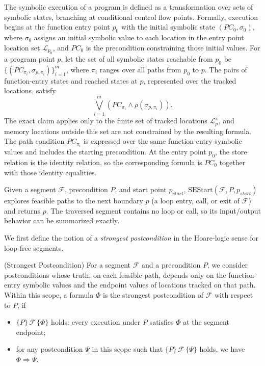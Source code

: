 The symbolic execution of a program is defined as a transformation over
sets of symbolic states, branching at conditional control flow points.
Formally, execution begins at the function entry point $p_0$ with the
initial symbolic state $(PC_0,\sigma_0)$, where $\sigma_0$ assigns an
initial symbolic value to each location in the entry point location set
$\mathcal{L}_{p_0}$, and $PC_0$ is the precondition constraining those
initial values. For a program point $p$, let the set of all symbolic
states reachable from $p_0$ be
$\{(PC_{\pi_i},\sigma_{p,\pi_i})\}_{i=1}^{m}$, where $\pi_i$ ranges over
all paths from $p_0$ to $p$.
{The pairs of function-entry states and reached states at $p$, represented over the tracked locations, satisfy
\[
\bigvee_{i=1}^{m}
\left(
PC_{\pi_i}\land\rho(\sigma_{p,\pi_i})
\right).
\]
The exact claim applies only to the finite set of tracked locations $\mathcal{L}^{\pi}_{p}$, and 
memory locations outside this set are not constrained by the resulting formula. 
The path condition $PC_{\pi_i}$ is expressed over the same function-entry symbolic values and includes the starting
precondition. At the entry
point $p_0$, the store relation is the identity relation, so the
corresponding formula is $PC_0$ together with those identity
equalities.}


Given a segment $\mathcal F$, precondition $P$, and start point $p_{\mathit{start}}$, $\mathrm{SEStart}(\mathcal F,P,p_{\mathit{start}})$ explores feasible paths to the next boundary $p$ (a loop entry, call, or exit of $\mathcal F$) and returns $p$. The traversed segment contains no loop or call, so its input/output behavior can be summarized exactly.

We first define the notion of a \emph{strongest postcondition} in the Hoare‑logic sense for loop‑free segments.

{
\begin{definition}{(Strongest Postcondition)}
For a segment $\mathcal{F}$ and a precondition $P$, we consider postconditions whose truth, on each feasible path, depends only on the function-entry symbolic values and the endpoint values of locations tracked on that path. Within this scope, a formula $\Phi$ is the strongest postcondition of $\mathcal{F}$ with respect to $P$, if
\begin{itemize}
    \item $\{P\}\,\mathcal{F}\,\{\Phi\}$ holds: every execution under $P$ satisfies $\Phi$ at the segment endpoint;
    \item for any postcondition $\Psi$ in this scope such that $\{P\}\,\mathcal{F}\,\{\Psi\}$ holds, we have $\Phi\Rightarrow\Psi$.
\end{itemize}
\end{definition}
}


